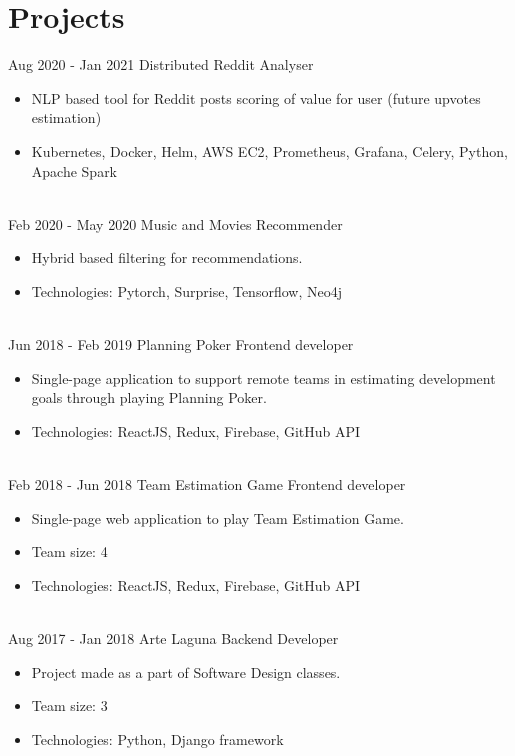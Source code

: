 \documentclass[letterpaper]{tenseconds} %
\begin{document}
\section{Projects}

\begin{twenty} %
	\twentyitem
	{Aug 2020 -}
	{Jan 2021}
	{Distributed Reddit Analyser \href{https://github.com/kk0walski/KubernetesScrapper}{\faGithub}}
	{}
	{}
	{\begin{itemize}
			\item NLP based tool for Reddit posts scoring of value for user (future upvotes estimation)
			\item Kubernetes, Docker, Helm, AWS EC2, Prometheus, Grafana, Celery, Python, Apache Spark
		\end{itemize}}
	\\
	\twentyitem
	{Feb 2020 -}
	{May 2020}
	{Music and Movies Recommender \href{https://sundog-education.com/recsys/}{\faExternalLink}}
	{}
	{}
	{\begin{itemize}
			\item Hybrid based filtering for recommendations.
			\item Technologies: Pytorch, Surprise, Tensorflow, Neo4j
		\end{itemize}}
	\\
	\twentyitem
	{Jun 2018 -}
	{Feb 2019}
	{Planning Poker \href{https://github.com/kk0walski/PlanningPoker}{\faGithub}}
	{Frontend developer}
	{}
	{\begin{itemize}
			\item Single-page application to support remote teams in estimating development goals through playing Planning Poker.
			\item Technologies: ReactJS, Redux, Firebase, GitHub API
		\end{itemize}}
	\\
	\twentyitem
	{Feb 2018 -}
	{Jun 2018}
	{Team Estimation Game  \href{https://www.github.com/kk0walski/reactiveTeamEstimationGame}{\faGithub}}
	{Frontend developer}
	{}
	{\begin{itemize}
			\item Single-page web application to play Team Estimation Game.
			\item Team size: 4
			\item Technologies: ReactJS, Redux, Firebase, GitHub API
		\end{itemize}}
	\\
	\twentyitem
	{Aug 2017 -}
	{Jan 2018}
	{Arte Laguna \href{https://github.com/kk0walski/konkurs}{\faGithub}}
	{Backend Developer}
	{}
	{\begin{itemize}
			\item Project made as a part of Software Design classes.
			\item Team size: 3
			\item Technologies: Python, Django framework
		\end{itemize}}
\end{twenty}
\end{document}
